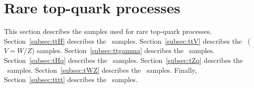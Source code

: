 \section{Rare top-quark processes}

This section describes the samples used for rare top-quark processes.
Section~\ref{subsec:ttH} describes the \ttH\ samples.
Section~\ref{subsec:ttV} describes the \ttV\ ($V=W/Z$) samples.
Section~\ref{subsec:ttgamma} describes the \ttgamma\ samples.
Section~\ref{subsec:tHq} describes the \tH\ samples.
Section~\ref{subsec:tZq} describes the \tZq\ samples.
Section~\ref{subsec:tWZ} describes the \tWZ\ samples.
Finally, Section~\ref{subsec:tttt} describes the \tttt\ samples.








%

